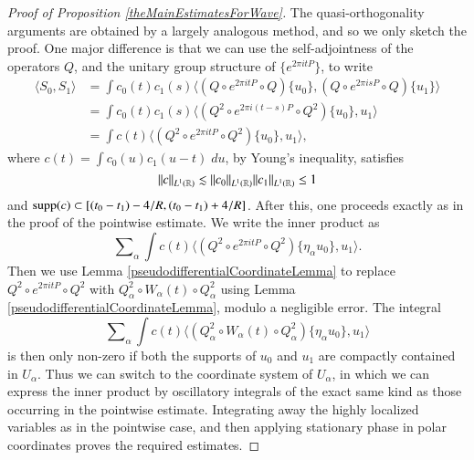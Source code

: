 \begin{proof}[Proof of Proposition \ref{theMainEstimatesForWave}]
The quasi-orthogonality arguments are obtained by a largely analogous method, and so we only sketch the proof. One major difference is that we can use the self-adjointness of the operators $Q$, and the unitary group structure of $\{ e^{2 \pi i t P} \}$, to write
%
\begin{equation}
\begin{split}
    \langle S_0, S_1 \rangle &= \int c_0(t) c_1(s) \big\langle (Q \circ e^{2 \pi i t P} \circ Q) \{ u_0 \}, (Q \circ e^{2 \pi i s P} \circ Q) \{ u_1 \} \big\rangle\\
    &= \int c_0(t) c_1(s) \big\langle (Q^2 \circ e^{2 \pi i (t - s) P} \circ Q^2) \{ u_0 \}, u_1 \big\rangle\\
    &= \int c(t) \big\langle (Q^2 \circ e^{2 \pi i t P} \circ Q^2) \{ u_0 \}, u_1 \big\rangle,
\end{split}
\end{equation}
%
where $c(t) = \int c_0(u) c_1(u - t)\; du$, by Young's inequality, satisfies
%
\begin{equation}
    \| c \|_{L^1(\operatorname{\mathbb{R}})} \lesssim \| c_0 \|_{L^1(\operatorname{\mathbb{R}})} \| c_1 \|_{L^1(\operatorname{\mathbb{R}})} \leq 1
\end{equation}
%
and $\operatorname{\text{supp}}(c) \subset [ (t_0 - t_1) - 4/R, (t_0 - t_1) + 4/R]$. After this, one proceeds exactly as in the proof of the pointwise estimate. We write the inner product as
%
\begin{equation}
    \sum\nolimits_\alpha \int c(t) \big\langle (Q^2 \circ e^{2 \pi i t P} \circ Q^2) \{ \eta_\alpha u_0 \}, u_1 \big\rangle.
\end{equation}
%
Then we use Lemma \ref{pseudodifferentialCoordinateLemma} to replace $Q^2 \circ e^{2 \pi i tP} \circ Q^2$ with $Q_{\alpha}^2 \circ W_{\alpha}(t) \circ Q_{\alpha}^2$ using Lemma \ref{pseudodifferentialCoordinateLemma}, modulo a negligible error. The integral
%
\begin{equation}
    \sum\nolimits_\alpha \int c(t) \big\langle (Q_{\alpha}^2 \circ W_{\alpha}(t) \circ Q_{\alpha}^2) \{ \eta_\alpha u_0 \}, u_1 \big\rangle
\end{equation}
%
is then only non-zero if both the supports of $u_0$ and $u_1$ are compactly contained in $U_\alpha$. Thus we can switch to the coordinate system of $U_\alpha$, in which we can express the inner product by oscillatory integrals of the exact same kind as those occurring in the pointwise estimate. Integrating away the highly localized variables as in the pointwise case, and then applying stationary phase in polar coordinates proves the required estimates.
\end{proof}

